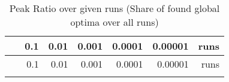 \documentclass[12pt,a4paper]{article}
\begin{document}
\begin{longtable}[c]{@{}crrrrrr@{}}
\caption{Peak Ratio over given runs (Share of found global optima over
all runs)}\tabularnewline
\toprule
\begin{minipage}[b]{0.11\columnwidth}\centering\strut
~
\strut\end{minipage} &
\begin{minipage}[b]{0.07\columnwidth}\raggedleft\strut
0.1
\strut\end{minipage} &
\begin{minipage}[b]{0.08\columnwidth}\raggedleft\strut
0.01
\strut\end{minipage} &
\begin{minipage}[b]{0.09\columnwidth}\raggedleft\strut
0.001
\strut\end{minipage} &
\begin{minipage}[b]{0.10\columnwidth}\raggedleft\strut
0.0001
\strut\end{minipage} &
\begin{minipage}[b]{0.11\columnwidth}\raggedleft\strut
0.00001
\strut\end{minipage} &
\begin{minipage}[b]{0.07\columnwidth}\raggedleft\strut
runs
\strut\end{minipage}\tabularnewline
\midrule
\endfirsthead
\toprule
\begin{minipage}[b]{0.11\columnwidth}\centering\strut
~
\strut\end{minipage} &
\begin{minipage}[b]{0.07\columnwidth}\raggedleft\strut
0.1
\strut\end{minipage} &
\begin{minipage}[b]{0.08\columnwidth}\raggedleft\strut
0.01
\strut\end{minipage} &
\begin{minipage}[b]{0.09\columnwidth}\raggedleft\strut
0.001
\strut\end{minipage} &
\begin{minipage}[b]{0.10\columnwidth}\raggedleft\strut
0.0001
\strut\end{minipage} &
\begin{minipage}[b]{0.11\columnwidth}\raggedleft\strut
0.00001
\strut\end{minipage} &
\begin{minipage}[b]{0.07\columnwidth}\raggedleft\strut
runs
\strut\end{minipage}\tabularnewline
\midrule
\endhead
\begin{minipage}[t]{0.11\columnwidth}\centering\strut

\end{minipage}
\end{longtable}
\end{document}
